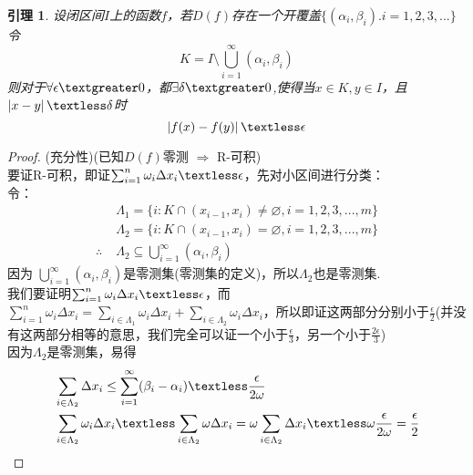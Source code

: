 \documentclass[12pt, a4paper, oneside]{ctexart}
\newtheorem{lemma}[theorem]{引理}
\begin{document}
\begin{lemma}
设闭区间$I$上的函数$f$，若$D(f)$存在一个开覆盖$\{(\alpha_i,\beta_i).i=1,2,3,...\}$\\
令
\begin{equation*}
    K=I \setminus \bigcup_{i=1}^{\infty}(\alpha_i,\beta_i)
\end{equation*}
则对于$\forall \epsilon \textgreater 0$，都$\exists \delta \textgreater 0 $,使得当$x \in K,y \in I$，且$\left|x-y\right|\textless \delta$时
\begin{equation*}
    \left| f(x)-f(y)     \right| \textless \epsilon
\end{equation*}
\end{lemma}


\begin{proof}
(充分性)(已知$D(f)$零测 $\Rightarrow$ R-可积)\\
要证R-可积，即证$\sum_{i=1}^{n}\omega_i \Delta x_i \textless \epsilon$，先对小区间进行分类：\\
令：
\begin{equation*}
    \begin{aligned}
           &\Lambda_1=\{i:K\cap (x_{i-1},x_i)\neq \varnothing ,i=1,2,3,...,m    \}\\
           &\Lambda_2=\{i:K\cap (x_{i-1},x_i)= \varnothing ,i=1,2,3,...,m     \}\\
           \therefore \; &\Lambda_2 \subseteq \bigcup_{i=1}^{\infty}(\alpha_i,\beta_i)
    \end{aligned}
\end{equation*}
因为 $\bigcup_{i=1}^{\infty}(\alpha_i,\beta_i)$是零测集(零测集的定义)，所以$\Lambda_2$也是零测集.\\
我们要证明$\sum_{i=1}^{n}\omega_i \Delta x_i \textless \epsilon$，而$\sum_{i=1}^{n}\omega_i \Delta x_i=\sum_{i \in \Lambda_1}\omega_i \Delta x_i+\sum_{i \in \Lambda_2}\omega_i \Delta x_i$，所以即证这两部分分别小于$\frac{\epsilon}{2}$(并没有这两部分相等的意思，我们完全可以证一个小于$\frac{\epsilon}{3}$，另一个小于$\frac{2\epsilon}{3}$)\\
因为$\Lambda_2$是零测集，易得
\begin{equation*}
\begin{aligned}
    & \sum_{i\in \Lambda_2 }\Delta x_i \leq  \sum_{i=1}^{\infty} (\beta_i -\alpha_i) \textless \frac{\epsilon}{2\omega}\\
    &  \sum_{i \in \Lambda_2}\omega_i \Delta x_i \textless \sum_{i \in \Lambda_2}\omega \Delta x_i = \omega \sum_{i \in \Lambda_2} \Delta x_i \textless \omega \frac{\epsilon}{2\omega}=\frac{\epsilon}{2}

\end{aligned}
\end{equation*}
\end{proof}
\end{document}
